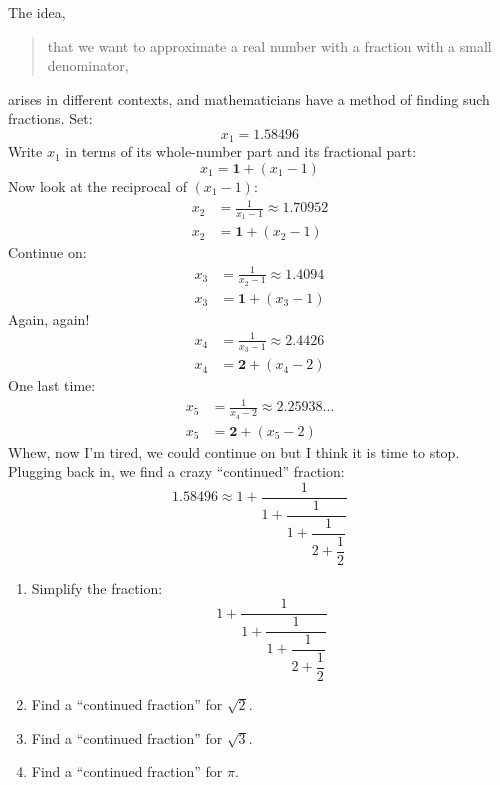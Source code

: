 \documentclass[12pt,noauthor,nooutcomes, handout]{ximera}
\begin{document}
\begin{question}
   The idea,
   \begin{quote}
   that we want to approximate a real number with a fraction with a small denominator,
   \end{quote}
   arises in different contexts, and mathematicians have a method of finding such fractions. 
    Set:
\[
x_1 = 1.58496
\]
Write $x_1$ in terms of its whole-number part and its fractional part:
\[
x_1 = \mathbf{1} + (x_1-1)
\]
Now look at the reciprocal of $(x_1-1)$:
\begin{align*}
x_2 &=\frac{1}{x_1-1} \approx 1.70952\\
x_2 &= \mathbf{1} + (x_2-1)
\end{align*}
Continue on:
\begin{align*}
x_3 &=\frac{1}{x_2-1} \approx 1.4094\\
x_3 &= \mathbf{1} + (x_3-1)
\end{align*}
Again, again!
\begin{align*}
x_4 &=\frac{1}{x_3-1} \approx 2.4426\\
x_4 &= \mathbf{2} + (x_4-2)
\end{align*}
One last time:
\begin{align*}
x_5 &=\frac{1}{x_4-2} \approx 2.25938\dots\\
x_5 &= \mathbf{2} + (x_5-2)
\end{align*}
Whew, now I'm tired, we could continue on but I think it is time to
stop. Plugging back in, we find a crazy ``continued'' fraction:
\[
 1.58496\approx 1 + \dfrac{1}{1+\dfrac{1}{1 + \dfrac{1}{2 + \dfrac{1}{2}}}}
\]
\begin{enumerate}
\item Simplify the fraction:
\[
 1 + \dfrac{1}{1+\dfrac{1}{1 + \dfrac{1}{2 + \dfrac{1}{2}}}}
\]

\item Find a ``continued fraction'' for $\sqrt{2}$.
\item Find a ``continued fraction'' for $\sqrt{3}$.
\item Find a ``continued fraction'' for $\pi$.
\end{enumerate}
\end{question}



\begin{question}

\end{question}
\end{document}
